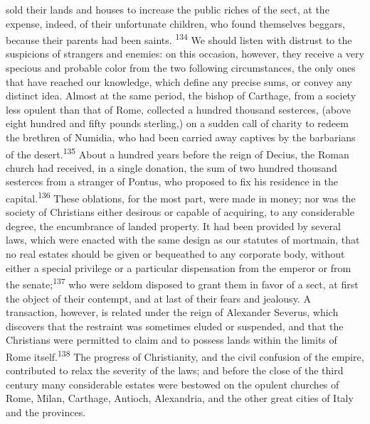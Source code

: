 sold their lands and houses to increase the public riches of the
sect, at the expense, indeed, of their unfortunate children, who
found themselves beggars, because their parents had been saints. \textsuperscript{134}
We should listen with distrust to the suspicions of strangers
and enemies: on this occasion, however, they receive a very
specious and probable color from the two following circumstances,
the only ones that have reached our knowledge, which define any
precise sums, or convey any distinct idea. Almost at the same
period, the bishop of Carthage, from a society less opulent than
that of Rome, collected a hundred thousand sesterces, (above
eight hundred and fifty pounds sterling,) on a sudden call of
charity to redeem the brethren of Numidia, who had been carried
away captives by the barbarians of the desert.\textsuperscript{135} About a
hundred years before the reign of Decius, the Roman church had
received, in a single donation, the sum of two hundred thousand
sesterces from a stranger of Pontus, who proposed to fix his
residence in the capital.\textsuperscript{136} These oblations, for the most part,
were made in money; nor was the society of Christians either
desirous or capable of acquiring, to any considerable degree, the
encumbrance of landed property. It had been provided by several
laws, which were enacted with the same design as our statutes of
mortmain, that no real estates should be given or bequeathed to
any corporate body, without either a special privilege or a
particular dispensation from the emperor or from the senate;\textsuperscript{137}
who were seldom disposed to grant them in favor of a sect, at
first the object of their contempt, and at last of their fears
and jealousy. A transaction, however, is related under the reign
of Alexander Severus, which discovers that the restraint was
sometimes eluded or suspended, and that the Christians were
permitted to claim and to possess lands within the limits of Rome
itself.\textsuperscript{138} The progress of Christianity, and the civil confusion
of the empire, contributed to relax the severity of the laws; and
before the close of the third century many considerable estates
were bestowed on the opulent churches of Rome, Milan, Carthage,
Antioch, Alexandria, and the other great cities of Italy and the
provinces.


